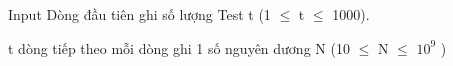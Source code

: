 Input
Dòng đầu tiên ghi số lượng Test t (1  $\le$  t  $\le$  1000).  

   t dòng tiếp theo mỗi dòng ghi 1 số nguyên dương N (10  $\le$  N  $\le$  $10^{9}$   )